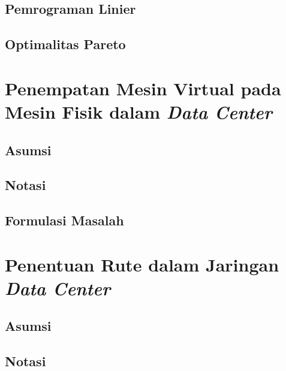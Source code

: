 \documentclass[ugmskripsi]{ugmskripsi}
\begin{document}
		\subsection{Pemrograman Linier}
		\label{pemrograman linier}
		
		
		\subsection{Optimalitas Pareto}
		\label{optimalitas pareto}
		
		
	\section{Penempatan Mesin Virtual pada Mesin Fisik dalam \textit{Data Center}}
	\label{penempatan vm}
		
		\subsection{Asumsi}
		\label{asumsi penempatan vm}
		
		
		\subsection{Notasi}
		\label{notasi penempatan vm}
		
		
		\subsection{Formulasi Masalah}
		\label{formulasi masalah penempatan vm}
		
		
	\section{Penentuan Rute dalam Jaringan \textit{Data Center}}
	\label{routing}
	
	\subsection{Asumsi}
		\label{asumsi routing}
		
		
		\subsection{Notasi}
		\label{notasi routing}
		
		
\end{document}
